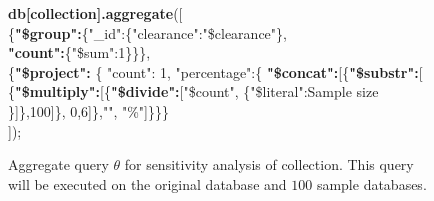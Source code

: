 \begin{figure}[H]
\begin{framed}
{\ttfamily \small{ 
\textbf{db[collection].aggregate}([\\
\{\textbf{"\$group":}\{"\_id":\{"clearance":"\$clearance"\},\\ \textbf{"count":}\{"\$sum":1\}\}\},\\
\{\textbf{"\$project":} \{  "count": 1, "percentage":\{
\textbf{"\$concat":}[\{\textbf{"\$substr":}[\\\{\textbf{"\$multiply":}[\{\textbf{"\$divide":}["\$count", \{"\$literal":Sample size \}]\},100]\}, 0,6]\},"", "\%"]\}\}\}\\]);
}
}
\end{framed}
\caption{Aggregate query $\theta$ for sensitivity analysis of collection. This query will be executed on the original database and $100$ sample databases.}
\label{fig:aggregate}
\end{figure}